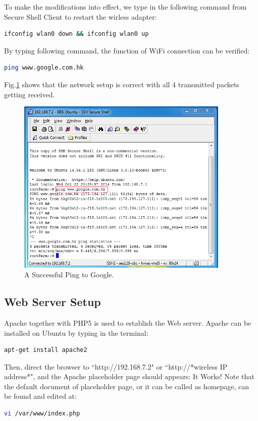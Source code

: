 \documentclass[12pt,journal,draftclsnofoot,onecolumn]{IEEEtran}
\begin{document}
To make the modifications into effect, we type in the following command from Secure Shell Client to restart the wirless adapter:
\begin{lstlisting}[language={bash}]
ifconfig wlan0 down && ifconfig wlan0 up
\end{lstlisting}
By typing following command, the function of WiFi connection can be verified:
\begin{lstlisting}[language={bash}]
ping www.google.com.hk
\end{lstlisting}
Fig.\ref{ping} shows that the network setup is correct with all 4 transmitted packets getting received.

\begin{figure}[htb]
	\centering
	\includegraphics[width=4in]{./figs/ping.PNG}
	\caption{A Successful Ping to Google.}
	\label{ping}
\end{figure}

\subsection{Web Server Setup}\label{Webser}
Apache together with PHP5 is used to establish the Web server. Apache can be installed on Ubuntu by typing in the terminal:
\begin{lstlisting}[language={bash}]
apt-get install apache2
\end{lstlisting}
Then, direct the browser to ``http://192.168.7.2" or ``http://*wireless IP address*", and the Apache placeholder page should appears: It Works! Note that the default document of placeholder page, or it can be called as homepage, can be found and edited at:
\begin{lstlisting}[language={bash}]
vi /var/www/index.php
\end{lstlisting}
	
\end{document}

